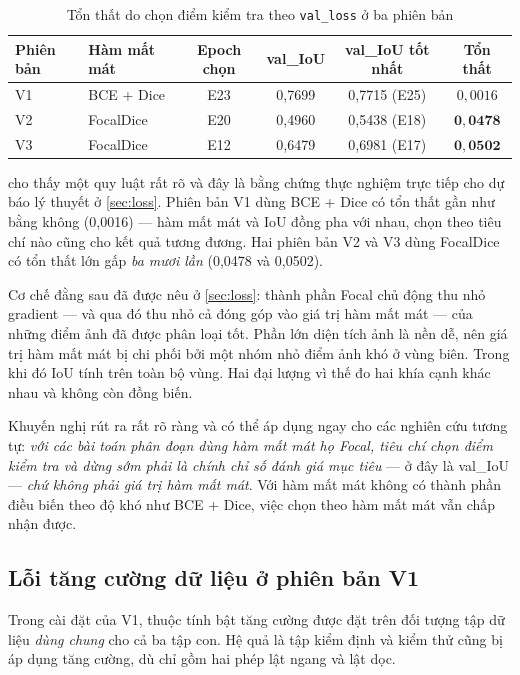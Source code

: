 \begin{table}[H]
\centering
\caption{Tổn thất do chọn điểm kiểm tra theo \texttt{val\_loss} ở ba phiên bản}
\label{tab:earlystop_loss}
\begin{tabular}{l l c c c c}
\toprule
\textbf{Phiên bản} & \textbf{Hàm mất mát} & \textbf{Epoch chọn} & \textbf{val\_IoU} & \textbf{val\_IoU tốt nhất} & \textbf{Tổn thất} \\
\midrule
V1 & BCE + Dice & E23 & 0,7699 & 0,7715 (E25) & $0{,}0016$ \\
V2 & FocalDice  & E20 & 0,4960 & 0,5438 (E18) & $\mathbf{0{,}0478}$ \\
V3 & FocalDice  & E12 & 0,6479 & 0,6981 (E17) & $\mathbf{0{,}0502}$ \\
\bottomrule
\end{tabular}
\end{table}

 cho thấy một quy luật rất rõ và đây là bằng chứng thực
nghiệm trực tiếp cho dự báo lý thuyết ở \cref{sec:loss}. Phiên bản V1 dùng
BCE + Dice có tổn thất gần như bằng không (0,0016) --- hàm mất mát và IoU đồng pha
với nhau, chọn theo tiêu chí nào cũng cho kết quả tương đương. Hai phiên bản V2 và
V3 dùng FocalDice có tổn thất lớn gấp \emph{ba mươi lần} (0,0478 và 0,0502).

Cơ chế đằng sau đã được nêu ở \cref{sec:loss}: thành phần Focal chủ động thu nhỏ
gradient --- và qua đó thu nhỏ cả đóng góp vào giá trị hàm mất mát --- của những
điểm ảnh đã được phân loại tốt. Phần lớn diện tích ảnh là nền dễ, nên giá trị hàm
mất mát bị chi phối bởi một nhóm nhỏ điểm ảnh khó ở vùng biên. Trong khi đó IoU
tính trên toàn bộ vùng. Hai đại lượng vì thế đo hai khía cạnh khác nhau và không
còn đồng biến.

Khuyến nghị rút ra rất rõ ràng và có thể áp dụng ngay cho các nghiên cứu tương tự:
\emph{với các bài toán phân đoạn dùng hàm mất mát họ Focal, tiêu chí chọn điểm
kiểm tra và dừng sớm phải là chính chỉ số đánh giá mục tiêu} --- ở đây là val\_IoU
--- \emph{chứ không phải giá trị hàm mất mát}. Với hàm mất mát không có thành phần
điều biến theo độ khó như BCE + Dice, việc chọn theo hàm mất mát vẫn chấp nhận
được.

\subsection{Lỗi tăng cường dữ liệu ở phiên bản V1}

Trong cài đặt của V1, thuộc tính bật tăng cường được đặt trên đối tượng tập dữ
liệu \emph{dùng chung} cho cả ba tập con. Hệ quả là tập kiểm định và kiểm thử cũng
bị áp dụng tăng cường, dù chỉ gồm hai phép lật ngang và lật dọc.

